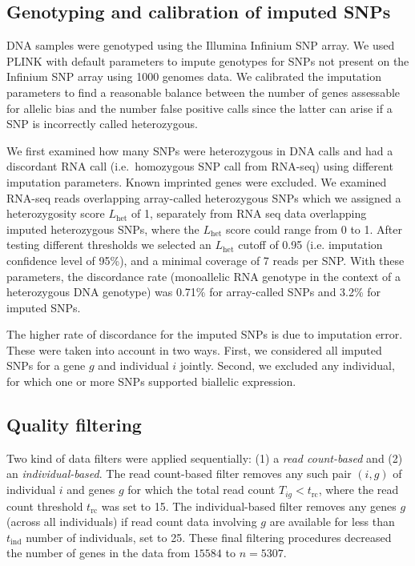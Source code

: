 \documentclass[letterpaper]{article}
\begin{document}
\subsection{Genotyping and calibration of imputed SNPs}

DNA samples were genotyped using the Illumina Infinium SNP array. We used
PLINK with default parameters to impute genotypes for SNPs not present on the
Infinium SNP array using 1000 genomes data.  We calibrated the
imputation parameters to find a reasonable balance between the number of genes
assessable for allelic bias and the number false positive
calls since the latter can arise if a SNP is
incorrectly called heterozygous.

We first examined how many SNPs were heterozygous in DNA calls and had a
discordant RNA call (i.e.~homozygous SNP call from RNA-seq) using different imputation
parameters. Known imprinted genes were excluded. We examined RNA-seq reads
overlapping array-called heterozygous SNPs which we assigned a heterozygosity
score \(L_\mathrm{het}\) of 1, separately from RNA seq data
overlapping imputed heterozygous SNPs, where the \(L_\mathrm{het}\) score could
range from 0 to 1.  After testing different thresholds
we selected an \(L_\mathrm{het}\) cutoff of 0.95 (i.e. imputation confidence
level of 95\%), and a minimal coverage of 7 reads per SNP. With these
parameters, the discordance rate (monoallelic RNA genotype in the context of a
heterozygous DNA genotype) was 0.71\% for array-called SNPs and 3.2\% for
imputed SNPs.

The higher rate of discordance for the imputed SNPs
is due to imputation error.  These were taken into
account in two ways.
First, we considered all imputed SNPs for a gene \(g\) and individual \(i\)
jointly.  Second, we excluded
any individual, for which one or more SNPs supported biallelic
expression.


\subsection{Quality filtering}

\label{sec:filtering}

Two kind of data filters were applied sequentially: (1) a \emph{read
count-based} and (2) an \emph{individual-based}.  The read count-based filter
removes any such pair $(i,g)$ of individual $i$ and genes $g$ for which the
total read count $T_{ig}<t_\mathrm{rc}$, where the read count threshold
$t_\mathrm{rc}$ was set to 15. The individual-based filter removes any genes
$g$ (across all individuals) if read count data involving $g$ are available
for less than $t_\mathrm{ind}$ number of individuals, set to 25.
These final filtering procedures decreased the number of genes in the data from
\(15584\) to \(n=5307\).
\end{document}
